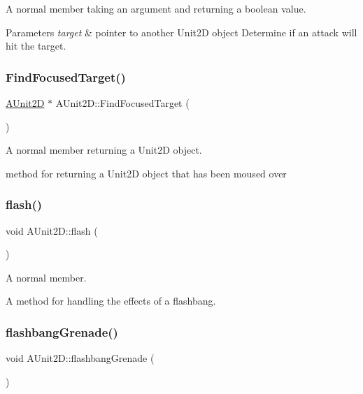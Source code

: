 A normal member taking an argument and returning a boolean value. 


\begin{DoxyParams}{Parameters}
{\em target} & pointer to another Unit2D object Determine if an attack will hit the target. \\
\hline
\end{DoxyParams}
\hypertarget{class_a_unit2_d_ab9a04722aeaa02b1d656c2ea7c6bdad2}{}\label{class_a_unit2_d_ab9a04722aeaa02b1d656c2ea7c6bdad2} 
\subsubsection{\texorpdfstring{Find\+Focused\+Target()}{FindFocusedTarget()}}
{\footnotesize\ttfamily \hyperlink{class_a_unit2_d}{A\+Unit2D} $\ast$ A\+Unit2\+D\+::\+Find\+Focused\+Target (\begin{DoxyParamCaption}{ }\end{DoxyParamCaption})}



A normal member returning a Unit2D object. 

method for returning a Unit2D object that has been moused over \hypertarget{class_a_unit2_d_a9ba62a68377a9584eee863d76079943b}{}\label{class_a_unit2_d_a9ba62a68377a9584eee863d76079943b} 
\subsubsection{\texorpdfstring{flash()}{flash()}}
{\footnotesize\ttfamily void A\+Unit2\+D\+::flash (\begin{DoxyParamCaption}{ }\end{DoxyParamCaption})}



A normal member. 

A method for handling the effects of a flashbang. \hypertarget{class_a_unit2_d_af14e1b38ce6238bb9343eca175c15f29}{}\label{class_a_unit2_d_af14e1b38ce6238bb9343eca175c15f29} 
\subsubsection{\texorpdfstring{flashbang\+Grenade()}{flashbangGrenade()}}
{\footnotesize\ttfamily void A\+Unit2\+D\+::flashbang\+Grenade (\begin{DoxyParamCaption}{ }\end{DoxyParamCaption})}



